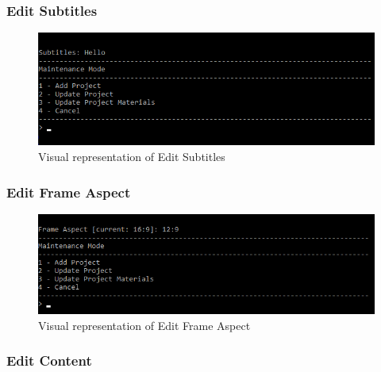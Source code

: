 \documentclass[
  english,
  a4paper,
,tablecaptionabove
]{scrartcl}
\begin{document}
\newpage

\hypertarget{edit-subtitles}{%
\subsubsection{Edit Subtitles}\label{edit-subtitles}}

\begin{figure}
\centering
\includegraphics{images/ui-screenshots/update-project-material-subtitles.png}
\caption{Visual representation of Edit Subtitles}
\end{figure}

\newpage

\hypertarget{edit-frame-aspect}{%
\subsubsection{Edit Frame Aspect}\label{edit-frame-aspect}}

\begin{figure}
\centering
\includegraphics{images/ui-screenshots/update-project-material-frame-aspect.png}
\caption{Visual representation of Edit Frame Aspect}
\end{figure}

\newpage

\hypertarget{edit-content}{%
\subsubsection{Edit Content}\label{edit-content}}
\end{document}
